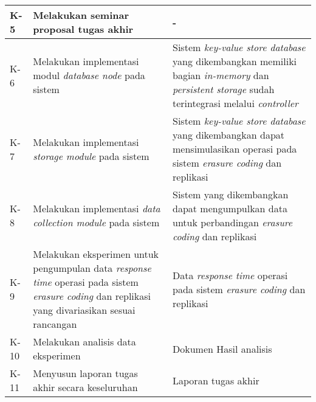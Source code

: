 \begin{longtable}{|p{1cm}|p{6cm}|p{6cm}|}
	K-5                    & Melakukan seminar proposal tugas akhir                                                                                                                          & -                                                                                                                                                                            \\ \hline
	K-6                    & Melakukan implementasi modul \textit{database node} pada sistem                                                                                                 & Sistem \textit{key-value store database} yang dikembangkan memiliki bagian \textit{in-memory} dan \textit{persistent storage} sudah terintegrasi melalui \textit{controller} \\ \hline
	K-7                    & Melakukan implementasi \textit{storage module} pada sistem                                                                                                      & Sistem \textit{key-value store database} yang dikembangkan dapat mensimulasikan operasi pada sistem \textit{erasure coding} dan replikasi                                    \\ \hline
	K-8                    & Melakukan implementasi \textit{data collection module} pada sistem                                                                                              & Sistem yang dikembangkan dapat mengumpulkan data untuk perbandingan \textit{erasure coding} dan replikasi                                                                    \\ \hline
	K-9                    & Melakukan eksperimen untuk pengumpulan data \textit{response time} operasi pada sistem \textit{erasure coding} dan replikasi yang divariasikan sesuai rancangan & Data \textit{response time} operasi pada sistem \textit{erasure coding} dan replikasi                                                                                        \\ \hline
	K-10                   & Melakukan analisis data eksperimen                                                                                                                              & Dokumen Hasil analisis                                                                                                                                                       \\ \hline
	K-11                   & Menyusun laporan tugas akhir secara keseluruhan                                                                                                                 & Laporan tugas akhir                                                                                                                                                          \\ \hline

\end{longtable}
